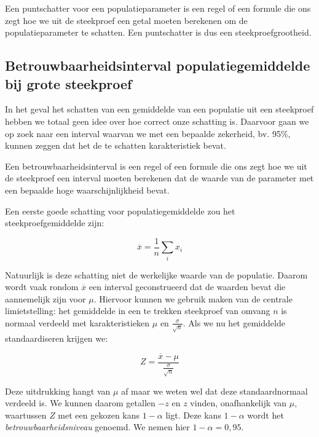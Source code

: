 {\begin{definition}[puntschatter]
  Een puntschatter voor een populatieparameter is een regel of een formule die ons zegt hoe we uit de steekproef een getal moeten berekenen om de populatieparameter te schatten. Een puntschatter is dus een steekproefgrootheid.
\end{definition}

\subsection{Betrouwbaarheidsinterval populatiegemiddelde bij grote steekproef}
\label{ssec:betrouwbaarheidsinterval-grote-steekproef}

In het geval het schatten van een gemiddelde van een populatie uit een steekproef hebben we totaal geen idee over hoe correct onze schatting is. Daarvoor gaan we op zoek naar een interval waarvan we met een bepaalde zekerheid, bv. 95\%, kunnen zeggen dat het de te schatten karakteristiek bevat.

\begin{definition}[Betrouwbaarheidsinterval]
Een betrouwbaarheidsinterval is een regel of een formule die ons zegt hoe we uit de steekproef een interval moeten berekenen dat de waarde van de parameter met een bepaalde hoge waarschijnlijkheid bevat.
\end{definition}

Een eerste goede schatting voor populatiegemiddelde zou het steekproefgemiddelde zijn:

\[ \overline{x} = \frac{1}{n} \sum_{i} x_{i} \]

Natuurlijk is deze schatting niet de werkelijke waarde van de populatie. Daarom wordt vaak rondom $\overline{x}$ een interval geconstrueerd dat de waarden bevat die aannemelijk zijn voor $\mu$. Hiervoor kunnen we gebruik maken van de centrale limietstelling: het gemiddelde in een te trekken steekproef van omvang $n$ is normaal verdeeld met karakteristieken $\mu$ en $\frac{\sigma}{\sqrt{n}}$.  Als we nu het gemiddelde standaardiseren krijgen we:

\[ Z = \frac{\overline{x} - \mu}{\frac{\sigma}{\sqrt{n}}} \]

Deze uitdrukking hangt van $\mu$ af maar we weten wel dat deze standaardnormaal verdeeld is. We kunnen daarom getallen $-z$ en $z$ vinden, onafhankelijk van $\mu$, waartussen $Z$ met een gekozen kans $1 - \alpha$ ligt. Deze kans $1 - \alpha$ wordt het \emph{betrouwbaarheidsniveau} genoemd. We nemen hier $1 - \alpha= 0,95$.

}
